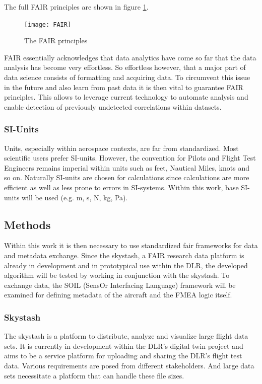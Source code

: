 The full FAIR principles are shown in figure \ref{fig:FAIR}.\cite{wilkinson_fair_2016}

\begin{figure}[h]
    \centering
    \texttt{[image: FAIR]}
    \caption{The FAIR principles \cite{wilkinson_fair_2016}}
    \label{fig:FAIR}
\end{figure}


FAIR essentially acknowledges that data analytics have come so far that the data analysis has become very effortless. So effortless however, that a major part of data science consists of formatting and acquiring data. To circumvent this issue in the future and also learn from past data it is then vital to guarantee FAIR principles. This allows to leverage current technology to automate analysis and enable detection of previously undetected correlations within datasets.


\subsubsection{SI-Units}
Units, especially within aerospace contexts, are far from standardized. Most scientific users prefer SI-units. However, the convention for Pilots and Flight Test Engineers remains imperial within units such as feet, Nautical Miles, knots and so on. Naturally SI-units are chosen for calculations since calculations are more efficient as well as less prone to errors in SI-systems. Within this work, base SI-units will be used (e.g. m, s, N, kg, Pa).

\subsection{Methods}

Within this work it is then necessary to use standardized fair frameworks for data and metadata exchange. Since the skystash, a FAIR research data platform is already in development and in prototypical use within the DLR, the developed algorithm will be tested by working in conjunction with the skystash. To exchange data, the SOIL (SensOr Interfacing Language) framework will be examined for defining metadata of the aircraft and the FMEA logic itself.

\subsubsection{Skystash}
\label{chap:skystash}
The skystash is a platform to distribute, analyze and visualize large flight data sets. It is currently in development within the DLR's digital twin project and aims to be a service platform for uploading and sharing the DLR's flight test data. Various requirements are posed from different stakeholders. And large data sets necessitate a platform that can handle these file sizes.

